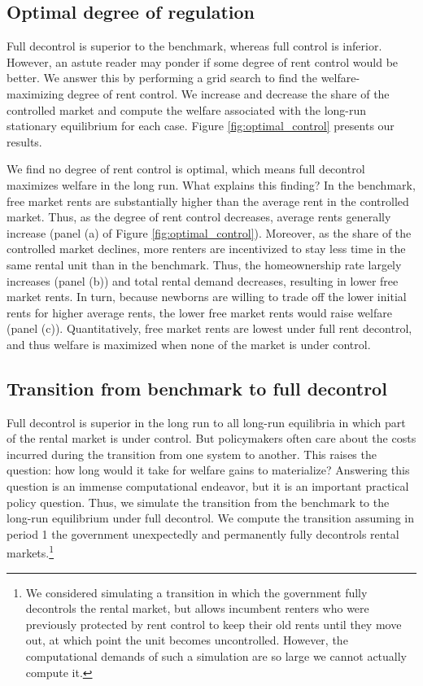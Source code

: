 \documentclass[parskip=full]{article}
\begin{document}
\subsection{Optimal degree of regulation}\label{subsection:optimal_control}

Full decontrol is superior to the benchmark, whereas full control is inferior. However, an astute reader may ponder if some degree of rent control would be better. We answer this by performing a grid search to find the welfare-maximizing degree of rent control. We increase and decrease the share of the controlled market and compute the welfare associated with the long-run stationary equilibrium for each case. Figure \ref{fig:optimal_control} presents our results.

We find no degree of rent control is optimal, which means full decontrol maximizes welfare in the long run. What explains this finding? In the benchmark, free market rents are substantially higher than the average rent in the controlled market. Thus, as the degree of rent control decreases, average rents generally increase (panel (a) of Figure \ref{fig:optimal_control}). Moreover, as the share of the controlled market declines, more renters are incentivized to stay less time in the same rental unit than in the benchmark. Thus, the homeownership rate largely increases (panel (b)) and total rental demand decreases, resulting in lower free market rents. In turn, because newborns are willing to trade off the lower initial rents for higher average rents, the lower free market rents would raise welfare (panel (c)). Quantitatively, free market rents are lowest under full rent decontrol, and thus welfare is maximized when none of the market is under control.

\subsection{Transition from benchmark to full decontrol}\label{subsection:transition}

Full decontrol is superior in the long run to all long-run equilibria in which part of the rental market is under control. But policymakers often care about the costs incurred during the transition from one system to another. This raises the question: how long would it take for welfare gains to materialize? Answering this question is an immense computational endeavor, but it is an important practical policy question. Thus, we simulate the transition from the benchmark to the long-run equilibrium under full decontrol. We compute the transition assuming in period 1 the government unexpectedly and permanently fully decontrols rental markets.\footnote{We considered simulating a transition in which the government fully decontrols the rental market, but allows incumbent renters who were previously protected by rent control to keep their old rents until they move out, at which point the unit becomes uncontrolled. However, the computational demands of such a simulation are so large we cannot actually compute it.}
\end{document}
